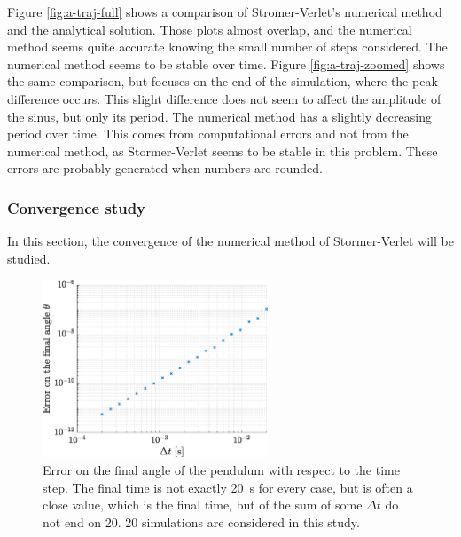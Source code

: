 \documentclass[a4paper,12pt,twoside]{article}
\begin{document}
Figure \ref{fig:a-traj-full} shows a comparison of Stromer-Verlet's numerical method and the analytical solution.
Those plots almost overlap, and the numerical method seems quite accurate knowing the small number of steps considered.
The numerical method seems to be stable over time.
Figure \ref{fig:a-traj-zoomed} shows the same comparison, but focuses on the end of the simulation, where the peak difference occurs.
This slight difference does not seem to affect the amplitude of the sinus, but only its period.
The numerical method has a slightly decreasing period over time.
This comes from computational errors and not from the numerical method, as Stormer-Verlet seems to be stable in this problem.
These errors are probably generated when numbers are rounded.


\subsubsection{Convergence study}
In this section, the convergence of the numerical method of Stormer-Verlet will be studied.

\begin{figure}[h]
\centering
	\includegraphics[width=0.6\textwidth]{graphs/a_conv.eps}
	\caption{Error on the final angle of the pendulum with respect to the time step. The final time is not exactly \SI{20}{\s} for every case, but is often a close value, which is the final time, but of the sum of some $\Delta t$ do not end on \num{20}. \num{20} simulations are considered in this study.} %
	\label{fig:a-conv}
\end{figure}
\end{document}
